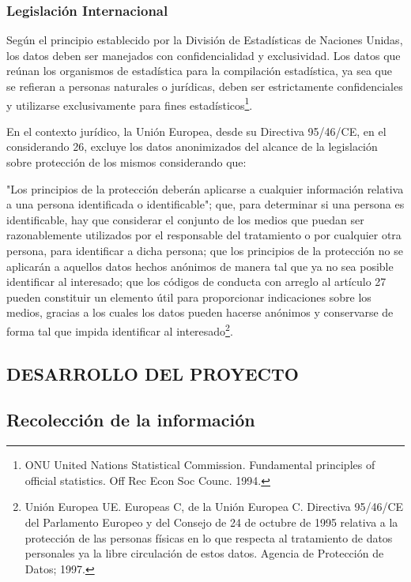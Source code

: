 \documentclass[a4paper,openright,12pt]{book}
\theoremstyle{definition}
\theoremstyle{remark}
\begin{document}
\subsection{Legislación Internacional}

Según el principio establecido por la División de Estadísticas de Naciones Unidas, los datos deben ser manejados con confidencialidad y exclusividad.
Los datos que reúnan los organismos de estadística para la compilación estadística, ya sea que se refieran a personas naturales o jurídicas, deben ser estrictamente confidenciales y utilizarse exclusivamente para fines estadísticos\footnote{ONU United Nations Statistical Commission. Fundamental principles of official statistics. Off Rec Econ Soc Counc. 1994.}.

En el contexto jurídico, la Unión Europea, desde su Directiva 95/46/CE, en el considerando 26, excluye los datos anonimizados del alcance de la legislación sobre protección de los mismos considerando que:

"Los principios de la protección deberán aplicarse a cualquier información relativa a una persona identificada o identificable"; que, para determinar si una persona es identificable, hay que considerar el conjunto de los medios que puedan ser razonablemente utilizados por el responsable del tratamiento o por cualquier otra persona, para identificar a dicha persona; que los principios de la protección no se aplicarán a aquellos datos hechos anónimos de manera tal que ya no sea posible identificar al interesado; que los códigos de conducta con arreglo al artículo 27 pueden constituir un elemento útil para proporcionar indicaciones sobre los medios, gracias a los cuales los datos pueden hacerse anónimos y conservarse de forma tal que impida identificar al interesado\footnote{Unión Europea UE. Europeas C, de la Unión Europea C. Directiva 95/46/CE del Parlamento Europeo y del Consejo de 24 de octubre de 1995 relativa a la protección de las personas físicas en lo que respecta al tratamiento de datos personales ya la libre circulación de estos datos. Agencia de Protección de Datos; 1997.}.

\begin{center}
 \chapter{DESARROLLO DEL PROYECTO}\label{cap.desarrollo}
\end{center}
\section{Recolección de la información}
\end{document}
